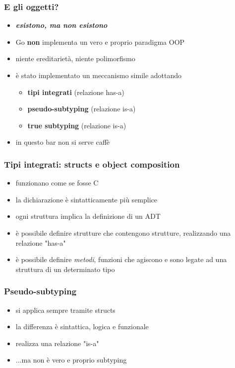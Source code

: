 \documentclass[12pt]{beamer}
\begin{document}
	\begin{frame}
		\frametitle{E gli oggetti?}
		\begin{itemize}[<+->]
			\item \textbf{\textit{esistono, ma non esistono}}
			\item Go \textbf{non} implementa un vero e proprio paradigma OOP
			\item niente ereditarietà, niente polimorfismo
			\item è stato implementato un meccanismo simile adottando 
			\begin{itemize}
				\item \textbf{tipi integrati} (relazione has-a)
				\item \textbf{pseudo-subtyping} (relazione is-a)
				\item \textbf{true subtyping} (relazione is-a)
			\end{itemize}
			 \item in questo bar non si serve caffè
		\end{itemize}
	\end{frame}
	
	 \begin{frame}
	 	\frametitle{Tipi integrati: structs e object composition}
		 \begin{itemize}[<+->]
		 	\item funzionano come se fosse C
		 	\item la dichiarazione è sintatticamente più semplice
			\item ogni struttura implica la definizione di un ADT
			\item è possibile definire strutture che contengono strutture, realizzando una relazione "has-a"
			\item è possibile definire \textit{metodi}, funzioni che agiscono e sono legate ad una struttura di un determinato tipo
		 \end{itemize}
	 \end{frame}
	 
	 \begin{frame}
	 	\frametitle{Pseudo-subtyping}
	 	\begin{itemize}[<+->]
	 		\item si applica sempre tramite structs
	 		\item la differenza è sintattica, logica e funzionale
	 		\item realizza una relazione "is-a"
	 		\item ...ma non è vero e proprio subtyping
	 	\end{itemize}
	 \end{frame}
	
\end{document}
